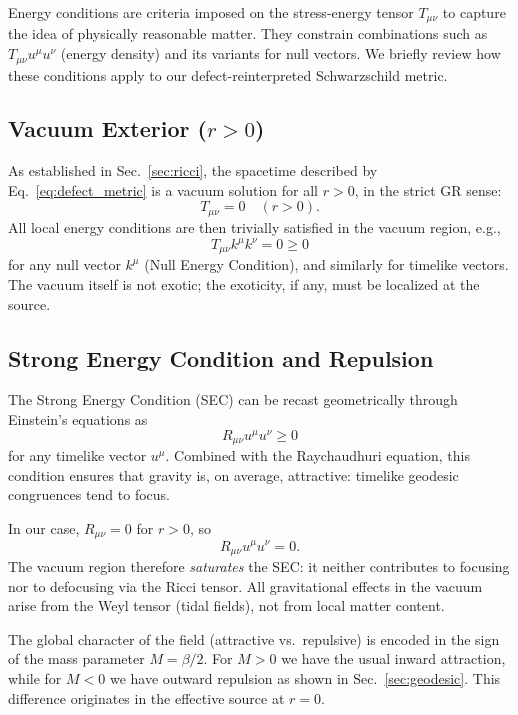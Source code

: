 \documentclass[%
  reprint,
  superscriptaddress,
  showpacs,
  showkeys,
  amsmath,amssymb,
  pra,
  longbibliography,
  floatfix,
  x11names
]{revtex4-2}
\begin{document}
Energy conditions are criteria imposed on the stress-energy tensor \(T_{\mu\nu}\) to capture the idea of physically reasonable matter. They constrain combinations such as \(T_{\mu\nu}u^\mu u^\nu\) (energy density) and its variants for null vectors. We briefly review how these conditions apply to our defect-reinterpreted Schwarzschild metric.

\subsection{Vacuum Exterior ($r > 0$)}

As established in Sec.~\ref{sec:ricci}, the spacetime described by Eq.~\eqref{eq:defect_metric} is a vacuum solution for all \(r>0\), in the strict GR sense:
\begin{equation}
T_{\mu\nu} = 0 \quad (r>0).
\end{equation}
All local energy conditions are then trivially satisfied in the vacuum region, e.g.,
\begin{equation}
T_{\mu\nu} k^\mu k^\nu = 0 \ge 0
\end{equation}
for any null vector \(k^\mu\) (Null Energy Condition), and similarly for timelike vectors. The vacuum itself is not exotic; the exoticity, if any, must be localized at the source.

\subsection{Strong Energy Condition and Repulsion}

The Strong Energy Condition (SEC) can be recast geometrically through Einstein's equations as
\begin{equation}
R_{\mu\nu}u^\mu u^\nu \ge 0
\end{equation}
for any timelike vector \(u^\mu\). Combined with the Raychaudhuri equation, this condition ensures that gravity is, on average, attractive: timelike geodesic congruences tend to focus.

In our case, \(R_{\mu\nu}=0\) for \(r>0\), so
\begin{equation}
R_{\mu\nu}u^\mu u^\nu = 0.
\end{equation}
The vacuum region therefore \emph{saturates} the SEC: it neither contributes to focusing nor to defocusing via the Ricci tensor. All gravitational effects in the vacuum arise from the Weyl tensor (tidal fields), not from local matter content.

The global character of the field (attractive vs.\ repulsive) is encoded in the sign of the mass parameter \(M=\beta/2\). For \(M>0\) we have the usual inward attraction, while for \(M<0\) we have outward repulsion as shown in Sec.~\ref{sec:geodesic}. This difference originates in the effective source at \(r=0\).
\end{document}
